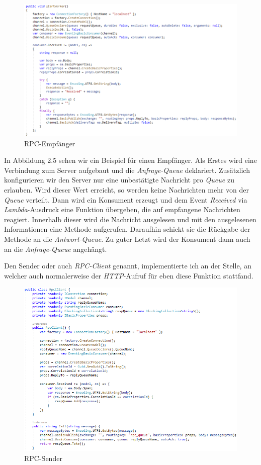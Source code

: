 \documentclass[12pt,a4paper]{scrartcl}
\begin{document}
\begin{figure}[h!]
	\centering
	\includegraphics[scale=0.6]{RPCWorkerWhite.png}
	\caption[RPC-Empfänger]{RPC-Empfänger}
\end{figure}

In Abbildung 2.5 sehen wir ein Beispiel für einen Empfänger. Als Erstes wird eine Verbindung zum Server aufgebaut und die \emph{Anfrage-Queue} deklariert. Zusätzlich konfigurieren wir den Server nur eine unbestätigte Nachricht pro \emph{Queue} zu erlauben. Wird dieser Wert erreicht, so werden keine Nachrichten mehr von der \emph{Queue} verteilt. Dann wird ein Konsument erzeugt und dem Event \emph{Received} via \emph{Lambda}-Ausdruck eine Funktion übergeben, die auf empfangene Nachrichten reagiert. Innerhalb dieser wird die Nachricht ausgelesen und mit den ausgelesenen Informationen eine Methode aufgerufen. Daraufhin schickt sie die Rückgabe der Methode an die \emph{Antwort-Queue}. Zu guter Letzt wird der Konsument dann auch an die \emph{Anfrage-Queue} angehängt.

Den Sender oder auch \emph{RPC-Client} genannt, implementierte ich an der Stelle, an welcher auch normalerweise der \emph{HTTP}-Aufruf für eben diese Funktion stattfand.

\begin{figure}[h!]
	\centering
	\includegraphics[scale=0.7]{RPCKlientWhite.png}
	\caption[RPC-Sender]{RPC-Sender}
\end{figure}
\end{document}
